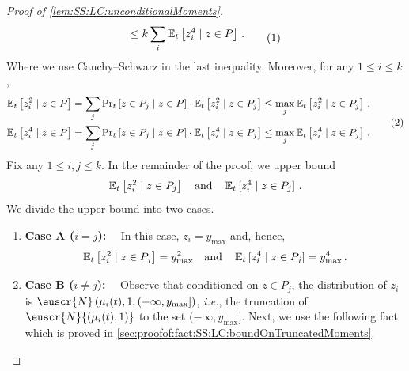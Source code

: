 \documentclass[11pt,letterpaper]{article}
\theoremstyle{plain}
\theoremstyle{definition}
\theoremstyle{remark}
\newcommand{\yesnum}{\addtocounter{equation}{1}\tag{\theequation}}
\newcommand{\quadtext}[1]{\quad\text{#1}\quad}
\newcommand{\quadand}{\quadtext{and}}
\newcommand{\inparen}[1]{\ensuremath{\left(#1\right)}}
\newcommand{\insquare}[1]{\ensuremath{\left[#1\right]}}
\newcommand{\E}{\operatornamewithlimits{\mathbb{E}}}
\newcommand{\Ex}{\E}
\newcommand{\customcal}[1]{\euscr{#1}}
\newcommand{\cN}{\customcal{N}}
\newcommand{\ie}{\emph{i.e.}}
\newcommand{\normal}[2]{\cN{\inparen{#1,#2}}}
\newcommand{\truncatedNormal}[3]{\cN\inparen{#1,#2,#3}}
\newcommand{\ymax}{y_{\max}}
\begin{document}
{{\begin{proof}[Proof of \cref{lem:SS:LC:unconditionalMoments}]
\begin{align*}
\begin{split}
                    \leq k \sum_i  \Ex\nolimits_{t}\insquare{z_i^4 \mid z\in P}\,.
                \end{split} 
                \yesnum\label{eq:SS:LC:unconditionalMoment:CS}
            \end{align*}
            Where we use Cauchy--Schwarz in the last inequality. 
            Moreover, for any $1\leq i\leq k$,  
            \begin{align*}
                \begin{split}
                    \Ex\nolimits_{t}\insquare{z_i^2  \mid z\in P}
                &= 
                \sum_j
                \Pr\nolimits_{t}\insquare{z\in P_j\mid z\in P}
                \cdot \Ex\nolimits_{t}\insquare{z_i^2 \mid z\in P_j}
                \leq \max_j \Ex\nolimits_{t}\insquare{z_i^2 \mid z\in P_j}\,,\\
                \Ex\nolimits_{t}\insquare{z_i^4 \mid z\in P}
                &= 
                \sum_j
                \Pr\nolimits_{t}\insquare{z\in P_j\mid z\in P}
                \cdot \Ex\nolimits_{t}\insquare{z_i^4 \mid z\in P_j}
                \leq \max_{j} \Ex\nolimits_{t}\insquare{z_i^4 \mid z\in P_j} \,.
                \end{split}
                \yesnum\label{eq:SS:LC:unconditionalMoment:AcrossLegs}
            \end{align*} 
            Fix any $1\leq i, j\leq k$.
            In the remainder of the proof, we upper bound 
            \[
                \Ex\nolimits_{t}\insquare{z_i^2 \mid z\in P_j}
                \quadand
                \Ex\nolimits_{t}\insquare{z_i^{\smash{4}} \mid z\in P_j}\,.
            \]
            We divide the upper bound into two cases.
            \begin{enumerate}
                \item \textbf{Case A ($i=j$):}~~ In this case, $z_i=\ymax$ and, hence,
                \[
                    \Ex\nolimits_{t}\insquare{z_i^2 \mid z\in P_j} = \ymax^2
                    \quadand
                    \Ex\nolimits_{t}\insquare{z_i^{\smash{4}} \mid z\in P_j} = \ymax^4 \,.
                \]
                \item \textbf{Case B ($i\neq j$):}~~ Observe that conditioned on $z\in P_j$, the distribution of $z_i$ is $\truncatedNormal{\mu_i(t)}{1}{(-\infty, \ymax]}$, \ie{}, the truncation of $\normal{\mu_i(t)}{1}$ to the set $(-\infty, \ymax]$.
                Next, we use the following fact which is proved in \cref{sec:proofof:fact:SS:LC:boundOnTruncatedMoments}.

\end{enumerate}
\end{proof}}}
\end{document}
